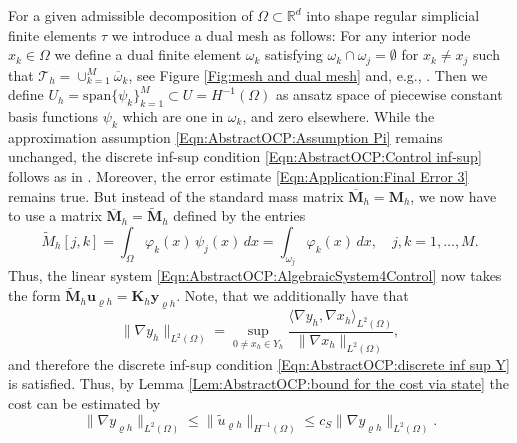 \documentclass{article}
\newcommand{\norm}[1]{\|#1\|}
\numberwithin{equation}{section}
\begin{document}
For a given admissible decomposition of $\Omega \subset {\mathbb{R}}^d$ into
shape regular simplicial finite elements $\tau$ we introduce a dual mesh as
follows: For any interior node $x_k \in \Omega$ we define a dual finite
element $\omega_k$ satisfying $\omega_k \cap \omega_j = \emptyset$ for
$x_k \neq x_j$ such that ${\mathcal{T}}_h = \cup_{k=1}^M \overline{\omega}_k$,
see Figure \ref{Fig:mesh and dual mesh} and, e.g., \cite{Steinbach:2002}.
Then we define $U_h = \mbox{span} \{ \psi_k \}_{k=1}^M \subset U=H^{-1}(\Omega)$
as ansatz space of piecewise constant basis functions $\psi_k$ which are one
in $\omega_k$, and zero elsewhere. While the approximation assumption
\eqref{Eqn:AbstractOCP:Assumption Pi} remains unchanged, the discrete
inf-sup condition \eqref{Eqn:AbstractOCP:Control inf-sup} follows
as in \cite{Steinbach:2002}. Moreover, the error estimate
\eqref{Eqn:Application:Final Error 3} remains true. But instead of the
standard mass matrix $\overline{\mathbf{M}}_h = \mathbf{M}_h$, we now have
to use a matrix $\overline{\mathbf{M}}_h = \widetilde{\mathbf{M}}_h$
defined by the entries
\[
  \widetilde{{M}}_h[j,k] = \int_\Omega \varphi_k(x) \, \psi_j(x) \, dx =
  \int_{\omega_j} \varphi_k(x) \, dx, \quad j,k=1,\ldots,M.
\]
Thus, the linear system \eqref{Eqn:AbstractOCP:AlgebraicSystem4Control} now
takes the form $\widetilde{\mathbf{M}}_h \mathbf{u}_{\varrho h} =
\mathbf{K}_h \mathbf{y}_{\varrho h}$. Note, that we additionally have that
\begin{equation*}
  \norm{\nabla y_h}_{L^2(\Omega)} = \sup_{0\neq x_h\in Y_h}
  \frac{\langle \nabla y_h, \nabla x_h \rangle_{L^2(\Omega)}}
  {\norm{\nabla x_h}_{L^2(\Omega)}},
\end{equation*}
and therefore the discrete inf-sup condition \eqref{Eqn:AbstractOCP:discrete inf sup Y} is satisfied. Thus, by Lemma \ref{Lem:AbstractOCP:bound for the cost via state} the cost can be estimated by 
\begin{equation}\label{Eqn:Application:cost bounds laplacian}
  \norm{\nabla y_{\varrho h}}_{L^2(\Omega)} \leq \norm{\widetilde{u}_{\varrho h}}_{H^{-1}(\Omega)}\leq c_S \norm{\nabla y_{\varrho h}}_{L^2(\Omega)}. 
\end{equation}
\end{document}
